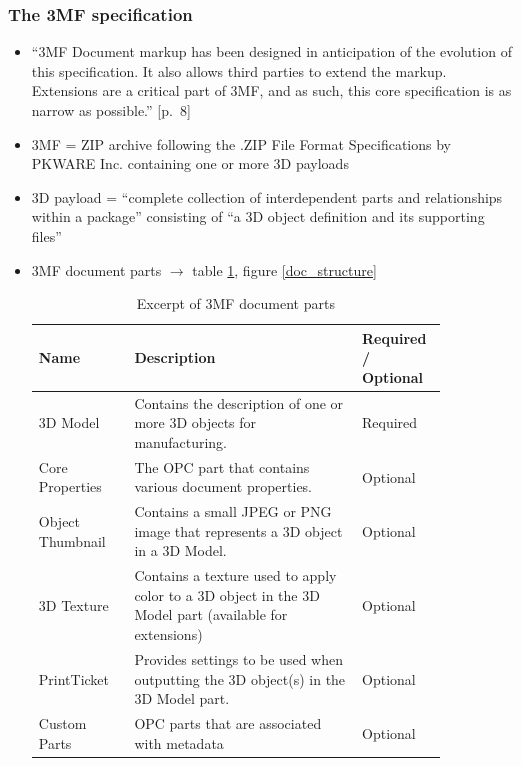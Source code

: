 \subsubsection{The 3MF specification} \cite{3mf_consortium_3mf_2025}
\begin{itemize}
    \item ``3MF Document markup has been designed in anticipation of the evolution of this specification. It also allows third parties to extend the markup. Extensions are a critical part of 3MF, and as such, this core specification is as narrow as possible.'' [p.~8]
    \item 3MF = ZIP archive following the .ZIP File Format Specifications by PKWARE Inc. containing one or more 3D payloads
    \item 3D payload = ``complete collection of interdependent parts and relationships within a package'' consisting of ``a 3D object definition and its supporting files''
    \item 3MF document parts $\rightarrow$ table \ref{doc_parts}, figure \ref{doc_structure}

    \begin{table}
        \renewcommand{\arraystretch}{1.3}
        \begin{tabular}{m{0.21\linewidth} m{0.5\linewidth} m{0.14\linewidth}}
            \textbf{Name} & \textbf{Description} & \textbf{Required /} \textbf{Optional} \\
            \hline
            3D Model & Contains the description of one or more 3D objects for
manufacturing. & Required \\
            Core Properties & The OPC part that contains various document properties. & Optional \\
            Object Thumbnail & Contains a small JPEG or PNG image that represents a 3D object in a 3D Model. & Optional \\
            3D Texture & Contains a texture used to apply color to a 3D object in the 3D Model part (available for extensions) & Optional \\
            PrintTicket & Provides settings to be used when outputting the 3D object(s) in the 3D Model part. & Optional \\
            Custom Parts & OPC parts that are associated with metadata & Optional
        \end{tabular}\smallskip

        \caption{Excerpt of 3MF document parts\cite[p.~4]{3mf_consortium_3mf_2025}}
        \label{doc_parts}
    \end{table}
    

\end{itemize}
